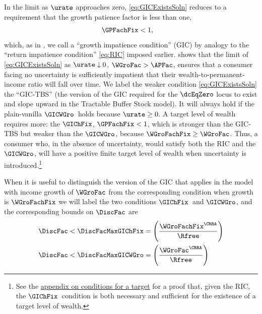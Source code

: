\documentclass{econark}
\begin{document}
In the limit as $\urate$ approaches zero, \eqref{eq:GICExistsSoln} reduces to a requirement that the growth patience factor is less than one,
\begin{equation}\begin{gathered}\begin{aligned}
  \GPFachFix & <  1 \label{eq:GICPGro}
,\end{aligned}\end{gathered}\end{equation}
which, as in ,  we call a ``growth impatience condition'' (GIC) by analogy to the ``return impatience condition'' \eqref{eq:RIC} imposed earlier.   shows that the limit of \eqref{eq:GICExistsSoln} as $\urate \downarrow 0$, $\WGroFac > \APFac$, ensures that a consumer facing no uncertainty is sufficiently impatient that their wealth-to-permanent-income ratio will fall over time.  
We label the weaker condition \eqref{eq:GICExistsSoln} the ``GIC-TBS'' (the version of the GIC required for the $\dcEqZero$ locus to exist and slope upward in the Tractable Buffer Stock model).  It will always hold if the plain-vanilla $\GICWGro$~holds because $\urate \geq 0$.  A target level of wealth requires more: the $\GIChFix$, $\GPFachFix < 1$, which is stronger than the GIC-TBS but weaker than the $\GICWGro$, because $\WGroFachFix \geq \WGroFac$.  Thus, a consumer who, in the absence of uncertainty, would satisfy both the RIC and the $\GICWGro$, will have a positive finite target level of wealth when uncertainty is introduced.\footnote{See the \hyperref[sec:mTargExists]{appendix on conditions for a target} for a proof that, given the RIC, the $\GIChFix$~condition is both necessary and sufficient for the existence of a target level of wealth.}

When it is useful to distinguish the version of the GIC that applies in the model with income growth of $\WGroFac$ from the corresponding condition when growth is $\WGroFachFix$ we will label the two conditions $\GIChFix$~and $\GICWGro$, and the corresponding bounds on $\DiscFac$ are
\begin{equation}\begin{gathered}\begin{aligned}
   \DiscFac < \DiscFacMaxGIChFix & =  \left(\frac{\WGroFachFix^{\CRRA}}{\Rfree}\right)
\\ \DiscFac < \DiscFacMaxGICWGro & =  \left(\frac{\WGroFac^{\CRRA}}{\Rfree}\right)
\end{aligned}\end{gathered}\end{equation}
\end{document}
